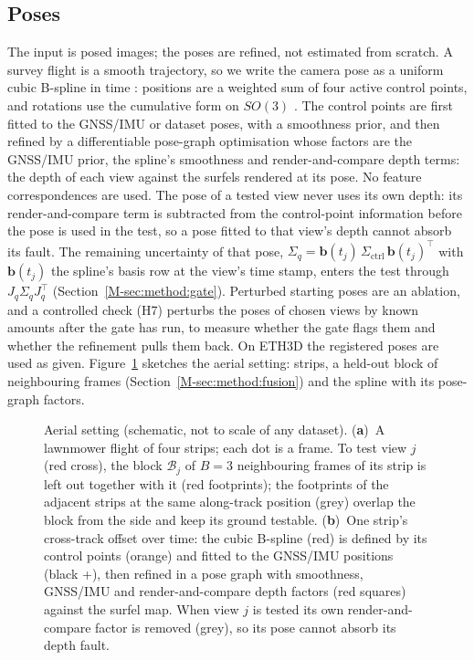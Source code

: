 \subsection{Poses}
The input is posed images; the poses are refined, not estimated from scratch. A survey flight is a
smooth trajectory, so we write the camera pose as a uniform cubic B-spline in time
\cite{traj_furgale_basis}: positions are a weighted sum of four active control points, and rotations use
the cumulative form on $SO(3)$ \cite{traj_sommer_bspline}. The control points are first fitted to the
GNSS/IMU or dataset poses, with a smoothness prior, and then refined by a differentiable pose-graph
optimisation whose factors are the GNSS/IMU prior, the spline's smoothness and render-and-compare depth
terms: the depth of each view against the surfels rendered at its pose. No feature correspondences are
used. The pose of a tested view never uses its own depth: its render-and-compare term is subtracted from
the control-point information before the pose is used in the test, so a pose fitted to that view's
depth cannot absorb its fault. The remaining uncertainty of that pose,
$\Sigma_q=\mathbf{b}(t_j)\,\Sigma_{\mathrm{ctrl}}\,\mathbf{b}(t_j)^{\top}$ with $\mathbf{b}(t_j)$ the spline's
basis row at the view's time stamp, enters the test through $J_q\Sigma_qJ_q^{\top}$
(Section~\ref{M-sec:method:gate}). Perturbed starting poses are an ablation, and a controlled check (H7) perturbs the poses of chosen
views by known amounts after the gate has run, to measure whether the gate flags them and whether the
refinement pulls them back. On ETH3D the registered poses are used as given. Figure~\ref{fig:aerial}
sketches the aerial setting: strips, a held-out block of neighbouring frames
(Section~\ref{M-sec:method:fusion}) and the spline with its pose-graph factors.

\begin{figure}[!t]
\centering

\caption{Aerial setting (schematic, not to scale of any dataset). (\textbf{a})~A lawnmower flight of
four strips; each dot is a frame. To test view $j$ (red cross), the block $\mathcal{B}_j$ of $B=3$
neighbouring frames of its strip is left out together with it (red footprints); the footprints of the
adjacent strips at the same along-track position (grey) overlap the block from the side and keep its
ground testable. (\textbf{b})~One strip's cross-track offset over time: the cubic B-spline (red) is
defined by its control points (orange) and fitted to the GNSS/IMU positions (black +), then refined in a
pose graph with smoothness, GNSS/IMU and render-and-compare depth factors (red squares) against the
surfel map. When view $j$ is tested its own render-and-compare factor is removed (grey), so its pose
cannot absorb its depth fault.}
\label{fig:aerial}
\end{figure}

